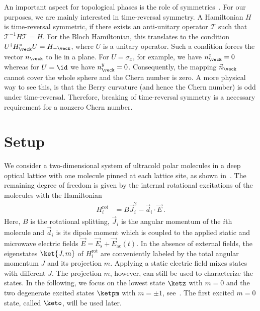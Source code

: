 An important aspect for topological phases is the role of symmetries~\cite{Schnyder2008}. For our purposes, we are mainly interested in time-reversal symmetry.
A Hamiltonian $H$ is time-reversal symmetric, if there exists an anti-unitary operator $\mathcal{T}$ such that $\mathcal{T}^{-1} H \mathcal{T} = H$.
For the Bloch Hamiltonian, this translates to the condition $U^\dag H_\veck^* U = H_{-\veck}$, where $U$ is a unitary operator.
Such a condition forces the vector $n_\veck$ to lie in a plane.
For $U=\sigma_x$, for example, we have $n^z_\veck = 0$ whereas for $U=\id$ we have $n^y_\veck=0$.
Consequently, the mapping $\vec{n}_\veck$ cannot cover the whole sphere and the Chern number is zero.
A more physical way to see this, is that the Berry curvature (and hence the Chern number) is odd under time-reversal.
Therefore, breaking of time-reversal symmetry is a necessary requirement for a nonzero Chern number.


\section{Setup}


We consider a two-dimensional system of ultracold polar molecules in a deep optical lattice with one molecule pinned at each lattice site, as shown in~.
The remaining degree of freedom is given by the internal rotational excitations of the molecules with the Hamiltonian
\begin{align}
    H^{\text{rot}}_i &= B \vec{J}_i^2 - \vec{d}_i\cdot\vec{E}\,.
\end{align}
Here, $B$ is the rotational splitting, $\vec{J}_i$ is the angular momentum of the $i$th molecule and $\vec{d}_i$ is its dipole moment which is coupled to the applied static and microwave electric fields $\vec{E} = \vec{E}_{\text{s}} + \vec{E}_{\text{ac}}(t)$.
In the absence of external fields, the eigenstates $\ket{J,m}$ of $H^{\text{rot}}_{i}$ are conveniently labeled by the total angular momentum $J$ and its projection $m$.
Applying a static electric field mixes states with different $J$.
The projection $m$, however, can still be used to characterize the states.
In the following, we focus on the lowest state $\ketz$ with $m=0$ and the two degenerate excited states $\ketpm$ with $m = \pm 1$, see~.
The first excited $m=0$ state, called $\keto$, will be used later.

